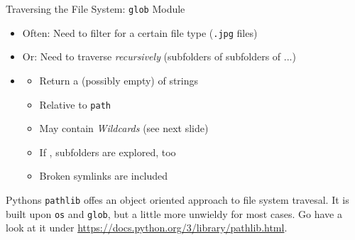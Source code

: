 \begin{frame}{Traversing the File System: \texttt{glob} Module}
%
\begin{itemize}
\item Often: Need to filter for a certain file type (\eg \texttt{.jpg} files)
\item Or: Need to traverse \emph{recursively} (subfolders of subfolders of ...)
\item {}
	\begin{itemize}
	\item Return a (possibly empty)  of strings
	\item Relative to \texttt{path}
	\item May contain \emph{Wildcards} (see next slide)
	\item If , subfolders are explored, too
	\item Broken symlinks are included
	\end{itemize}
\end{itemize}
%
\begin{hintbox}
Pythons \texttt{pathlib} offes an object oriented approach to file system travesal. It is built upon \texttt{os} and \texttt{glob}, but a little more unwieldy for most cases. Go have a look at it under \url{https://docs.python.org/3/library/pathlib.html}.
\end{hintbox}
%
\end{frame}


